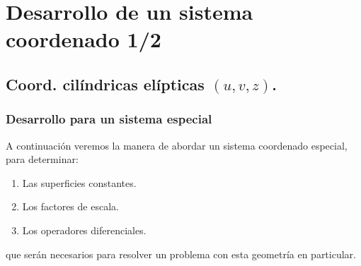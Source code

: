 \documentclass[12pt]{beamer}
\begin{document}

\section{Desarrollo de un sistema coordenado 1/2}
\subsection{Coord. cilíndricas elípticas \texorpdfstring{$(u, v, z)$}{(u, v, z)}.}

\begin{frame}
\frametitle{Desarrollo para un sistema especial}
A continuación veremos la manera de abordar un sistema coordenado especial, para determinar:
\pause
{}
\begin{enumerate}[<+->]
\item Las superficies constantes.
\item Los factores de escala.
\item Los operadores diferenciales.
\end{enumerate}
\pause
que serán necesarios para resolver un problema con esta geometría en particular.
\end{frame}
\end{document}
